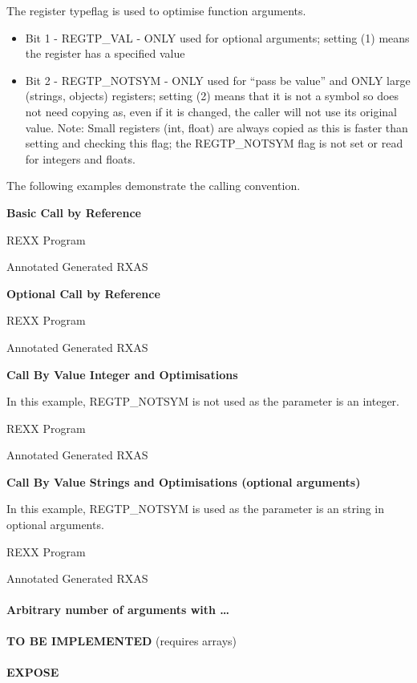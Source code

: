 The register typeflag is used to optimise function arguments.

\begin{itemize}
\item
  Bit 1 - REGTP\_VAL - ONLY used for optional arguments; setting (1)
  means the register has a specified value
\item
  Bit 2 - REGTP\_NOTSYM - ONLY used for ``pass be value'' and ONLY large
  (strings, objects) registers; setting (2) means that it is not a
  symbol so does not need copying as, even if it is changed, the caller
  will not use its original value. Note: Small registers (int, float)
  are always copied as this is faster than setting and checking this
  flag; the REGTP\_NOTSYM flag is not set or read for integers and
  floats.
\end{itemize}

The following examples demonstrate the calling convention.

\textbf{Basic Call by Reference}

REXX Program

Annotated Generated RXAS

\textbf{Optional Call by Reference}

REXX Program

Annotated Generated RXAS

\textbf{Call By Value Integer and Optimisations}

In this example, REGTP\_NOTSYM is not used as the parameter is an
integer.

REXX Program

Annotated Generated RXAS

\textbf{Call By Value Strings and Optimisations (optional arguments)}

In this example, REGTP\_NOTSYM is used as the parameter is an string in
optional arguments.

REXX Program

Annotated Generated RXAS

\hypertarget{arbitrary-number-of-arguments-with}{%
\paragraph{Arbitrary number of arguments with
\ldots{}}\label{arbitrary-number-of-arguments-with}}

\textbf{TO BE IMPLEMENTED} (requires arrays)

\hypertarget{expose}{%
\paragraph{EXPOSE}\label{expose}}

